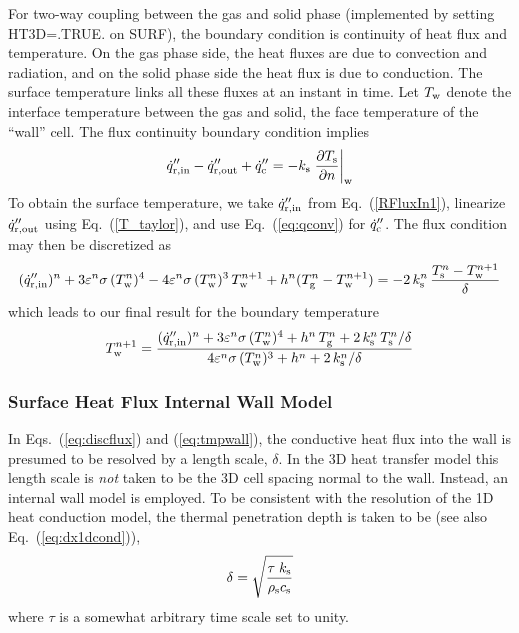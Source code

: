 For two-way coupling between the gas and solid phase (implemented by setting {\ct HT3D=.TRUE.} on {\ct SURF}), the boundary condition is continuity of heat flux and temperature.  On the gas phase side, the heat fluxes are due to convection and radiation, and on the solid phase side the heat flux is due to conduction.  The surface temperature links all these fluxes at an instant in time.  Let $T_{\rm w}$ denote the interface temperature between the gas and solid, the face temperature of the ``wall'' cell.  The flux continuity boundary condition implies
\begin{equation}
\label{eq:fluxcontinuity}
\dot{q}_{\rm r, in}'' - \dot{q}_{\rm r, out}'' + \dot{q}_{\rm c}'' = -k_{\rm s} \left. \frac{\partial T_{\rm s}}{\partial n} \right|_{\rm w}
\end{equation}
To obtain the surface temperature, we take $\dot{q}_{\rm r, in}''$ from Eq.~(\ref{RFluxIn1}), linearize $\dot{q}_{\rm r, out}''$ using Eq.~(\ref{T_taylor}), and use Eq.~(\ref{eq:qconv}) for $\dot{q}_{\rm c}''$. The flux condition may then be discretized as
\begin{equation}
\label{eq:discflux}
( \dot{q}_{\rm r, in}'' )^n + 3 \varepsilon^n \sigma \, (T_{\rm w}^n)^4 - 4 \varepsilon^n \sigma \, (T_{\rm w}^n)^3 \, T_{\rm w}^{n+1} + h^n (T_{\rm g}^n - T_{\rm w}^{n+1}) = -2 \, k_{\rm s}^n \, \frac{T_{\rm s}^n - T_{\rm w}^{n+1}}{\delta}
\end{equation}
which leads to our final result for the boundary temperature
\begin{equation}
\label{eq:tmpwall}
T_{\rm w}^{n+1} = \frac{ ( \dot{q}_{\rm r, in}'' )^n + 3 \varepsilon^n \sigma \, (T_{\rm w}^n)^4 + h^n \, T_{\rm g}^n + 2 \, k_{\rm s}^n \, T_{\rm s}^n/\delta }{ 4 \varepsilon^n \sigma \, (T_{\rm w}^n)^3 + h^n + 2 \, k_{\rm s}^n / \delta}
\end{equation}

\subsubsection*{Surface Heat Flux Internal Wall Model}

In Eqs.~(\ref{eq:discflux}) and (\ref{eq:tmpwall}), the conductive heat flux into the wall is presumed to be resolved by a length scale, $\delta$.  In the 3D heat transfer model this length scale is \emph{not} taken to be the 3D cell spacing normal to the wall.  Instead, an internal wall model is employed.  To be consistent with the resolution of the 1D heat conduction model, the thermal penetration depth is taken to be (see also Eq.~(\ref{eq:dx1dcond})),
\begin{equation}
\label{eq:pendepth}
\delta = \sqrt{\frac{ \tau \; k_{\rm s}}{\rho_{\rm s} c_{\rm s}}}
\end{equation}
where $\tau$ is a somewhat arbitrary time scale set to unity.

